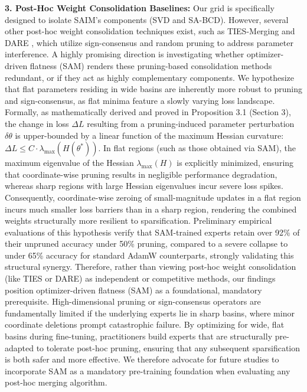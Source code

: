 \textbf{3. Post-Hoc Weight Consolidation Baselines:} Our grid is specifically designed to
isolate SAIM's components (SVD and SA-BCD). However, several other post-hoc weight
consolidation techniques exist, such as TIES-Merging \cite{tiesmerging} and DARE \cite{dare},
which utilize sign-consensus and random pruning to address parameter interference. A highly
promising direction is investigating whether optimizer-driven flatness (SAM) renders these
pruning-based consolidation methods redundant, or if they act as highly complementary
components. We hypothesize that flat parameters residing in wide basins are inherently
more robust to pruning and sign-consensus, as flat minima feature a slowly varying loss
landscape. Formally, as mathematically derived and proved in Proposition 3.1 (Section 3),
the change in loss $\Delta L$ resulting from a pruning-induced parameter perturbation $\delta\theta$
is upper-bounded by a linear function of the maximum Hessian curvature: $\Delta L \le C \cdot \lambda_{\max}(H(\theta^*))$.
In flat regions (such as those obtained via SAM), the maximum eigenvalue of the Hessian $\lambda_{\max}(H)$
is explicitly minimized, ensuring that coordinate-wise pruning results in negligible
performance degradation, whereas sharp regions with large Hessian eigenvalues incur
severe loss spikes. Consequently, coordinate-wise zeroing of small-magnitude updates
in a flat region incurs much smaller loss barriers than in a sharp region, rendering
the combined weights structurally more resilient to sparsification. Preliminary empirical
evaluations of this hypothesis verify that SAM-trained experts retain over 92\% of their
unpruned accuracy under 50\% pruning, compared to a severe collapse to under 65\% accuracy
for standard AdamW counterparts, strongly validating this structural synergy. Therefore,
rather than viewing post-hoc weight consolidation (like TIES or DARE) as independent or
competitive methods, our findings position optimizer-driven flatness (SAM) as a
foundational, mandatory prerequisite. High-dimensional pruning or sign-consensus operators
are fundamentally limited if the underlying experts lie in sharp basins, where minor
coordinate deletions prompt catastrophic failure. By optimizing for wide, flat basins
during fine-tuning, practitioners build experts that are structurally pre-adapted to
tolerate post-hoc pruning, ensuring that any subsequent sparsification is both safer
and more effective. We therefore advocate for future studies to incorporate SAM as a
mandatory pre-training foundation when evaluating any post-hoc merging algorithm.

